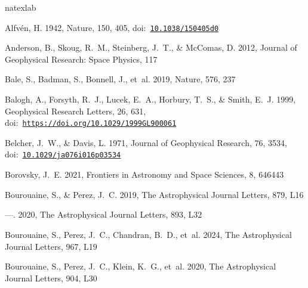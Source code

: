 \documentclass[twocolumn, times]{aastex631}
\begin{document}

\begin{thebibliography}{}
\expandafter\ifx\csname natexlab\endcsname\relax\def\natexlab#1{#1}\fi
\providecommand{\url}[1]{\href{#1}{#1}}
\providecommand{\dodoi}[1]{doi:~\href{http://doi.org/#1}{\nolinkurl{#1}}}
\providecommand{\doeprint}[1]{\href{http://ascl.net/#1}{\nolinkurl{http://ascl.net/#1}}}
\providecommand{\doarXiv}[1]{\href{https://arxiv.org/abs/#1}{\nolinkurl{https://arxiv.org/abs/#1}}}

Alfvén, H. 1942, Nature, 150, 405, \dodoi{10.1038/150405d0}

Anderson, B., Skoug, R.~M., Steinberg, J.~T., \& McComas, D. 2012, Journal of Geophysical Research: Space Physics, 117

Bale, S., Badman, S., Bonnell, J., {et~al.} 2019, Nature, 576, 237

Balogh, A., Forsyth, R.~J., Lucek, E.~A., Horbury, T.~S., \& Smith, E.~J. 1999, Geophysical Research Letters, 26, 631, \dodoi{https://doi.org/10.1029/1999GL900061}

Belcher, J.~W., \& Davis, L. 1971, Journal of Geophysical Research, 76, 3534, \dodoi{10.1029/ja076i016p03534}

Borovsky, J.~E. 2021, Frontiers in Astronomy and Space Sciences, 8, 646443

Bourouaine, S., \& Perez, J.~C. 2019, The Astrophysical Journal Letters, 879, L16

---. 2020, The Astrophysical Journal Letters, 893, L32

Bourouaine, S., Perez, J.~C., Chandran, B.~D., {et~al.} 2024, The Astrophysical Journal Letters, 967, L19

Bourouaine, S., Perez, J.~C., Klein, K.~G., {et~al.} 2020, The Astrophysical Journal Letters, 904, L30


\end{thebibliography}
\end{document}
